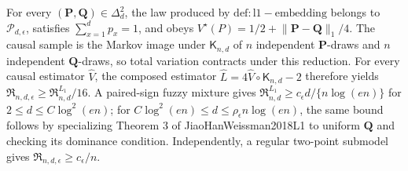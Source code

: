 For every \((\mathbf P,\mathbf Q)\in\Delta_d^2\), the law produced by \(\mathrm{def:l1-embedding}\) belongs to \(\mathcal P_{d,\epsilon}\), satisfies \(\sum_{x=1}^dp_x=1\), and obeys \(V^\star(P)=1/2+\lVert\mathbf P-\mathbf Q\rVert_1/4\). The causal sample is the Markov image under \(\mathsf K_{n,d}\) of \(n\) independent \(\mathbf P\)-draws and \(n\) independent \(\mathbf Q\)-draws, so total variation contracts under this reduction. For every causal estimator \(\widehat V\), the composed estimator \(\widehat L=4\widehat V\circ\mathsf K_{n,d}-2\) therefore yields \(\mathfrak R_{n,d,\epsilon}\ge\mathfrak R^{L_1}_{n,d}/16\). A paired-sign fuzzy mixture gives \(\mathfrak R^{L_1}_{n,d}\ge c_\epsilon d/\{n\log(en)\}\) for \(2\le d\le C\log^2(en)\); for \(C\log^2(en)\le d\le\rho_\epsilon n\log(en)\), the same bound follows by specializing Theorem 3 of JiaoHanWeissman2018L1 to uniform \(\mathbf Q\) and checking its dominance condition. Independently, a regular two-point submodel gives \(\mathfrak R_{n,d,\epsilon}\ge c_\epsilon/n\).